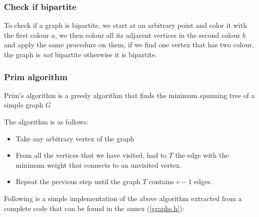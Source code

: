 \documentclass[11pt,twoside]{article}
\theoremstyle{defi}
\begin{document}
\subsubsection{Check if bipartite}
To check if a graph is bipartite, we start at an arbitrary point and color it with the first colour $a$, we then colour all its adjacent vertices in the second colour $b$ and apply the same procedure on them, if we find one vertex that has two colour, the graph is \emph{not} bipartite otherwise it is bipartite.

\newpage

\subsubsection{Prim algorithm}
\begin{definitionii}
Prim's algorithm is a greedy algorithm that finds the minimum spanning tree of a simple graph $G$
\end{definitionii}
The algorithm is as follows:
\begin{itemize}
\item Take any arbitrary vertex of the graph
\item From all the vertices that we have visited, had to $T$ the edge with the minimum weight that connects to an unvisited vertex.
\item Repeat the previous step until the graph $T$ contains $v-1$ edges.
\end{itemize}
Following is a simple implementation of the above algorithm extracted from a complete code that can be found in the annex (\ref{graphs.h}):


\newpage
\end{document}
